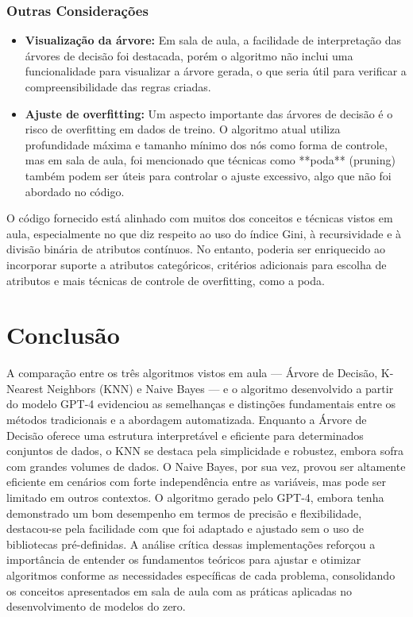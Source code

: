 \documentclass[12pt]{article}
\begin{document}
\subsubsection*{Outras Considerações}

\begin{itemize}
    \item \textbf{Visualização da árvore:} Em sala de aula, a facilidade de interpretação das árvores de decisão foi destacada, porém o algoritmo não inclui uma funcionalidade para visualizar a árvore gerada, o que seria útil para verificar a compreensibilidade das regras criadas.
    
    \item \textbf{Ajuste de overfitting:} Um aspecto importante das árvores de decisão é o risco de overfitting em dados de treino. O algoritmo atual utiliza profundidade máxima e tamanho mínimo dos nós como forma de controle, mas em sala de aula, foi mencionado que técnicas como **poda** (pruning) também podem ser úteis para controlar o ajuste excessivo, algo que não foi abordado no código.
\end{itemize}

O código fornecido está alinhado com muitos dos conceitos e técnicas vistos em aula, especialmente no que diz respeito ao uso do índice Gini, à recursividade e à divisão binária de atributos contínuos. No entanto, poderia ser enriquecido ao incorporar suporte a atributos categóricos, critérios adicionais para escolha de atributos e mais técnicas de controle de overfitting, como a poda.




\section{Conclusão}

\label{sec:conclusao}

    A comparação entre os três algoritmos vistos em aula — Árvore de Decisão, K-Nearest Neighbors (KNN) e Naive Bayes — e o algoritmo desenvolvido a partir do modelo GPT-4 evidenciou as semelhanças e distinções fundamentais entre os métodos tradicionais e a abordagem automatizada. Enquanto a Árvore de Decisão oferece uma estrutura interpretável e eficiente para determinados conjuntos de dados, o KNN se destaca pela simplicidade e robustez, embora sofra com grandes volumes de dados. O Naive Bayes, por sua vez, provou ser altamente eficiente em cenários com forte independência entre as variáveis, mas pode ser limitado em outros contextos. O algoritmo gerado pelo GPT-4, embora tenha demonstrado um bom desempenho em termos de precisão e flexibilidade, destacou-se pela facilidade com que foi adaptado e ajustado sem o uso de bibliotecas pré-definidas. A análise crítica dessas implementações reforçou a importância de entender os fundamentos teóricos para ajustar e otimizar algoritmos conforme as necessidades específicas de cada problema, consolidando os conceitos apresentados em sala de aula com as práticas aplicadas no desenvolvimento de modelos do zero.
    
    
    
\end{document}
